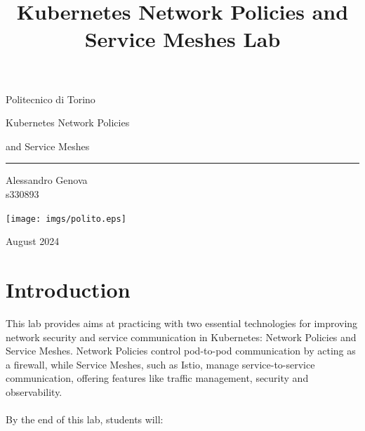 \documentclass{article}
\title{Kubernetes Network Policies and Service Meshes Lab}
\date{} %
\begin{document}
\begin{center}
  \textnormal{\LARGE Politecnico di Torino} %
\end{center}

\begin{center}
  \vspace*{6cm} %
  {\color{myblue}\Huge \textsf{Kubernetes Network Policies}} %
  
  \vspace{0.5cm} %
  
  {\color{myblue}\Huge \textsf{and Service Meshes}} %
  
  \vspace{0.5cm} %
  \noindent\textcolor{myblue}{\rule{\textwidth}{0.8pt}} %
\end{center}

\vspace*{\fill}
\begin{center}
    \large Alessandro Genova \\ %
    \large s330893
    \vspace*{0.5cm}
\end{center}

\begin{center}
    \texttt{[image: imgs/polito.eps]} %
\end{center}

\begin{center}
    \vspace*{0.5cm}
    August 2024
\end{center} 

\newpage
\tableofcontents
\newpage

\section{Introduction}
This lab provides aims at practicing with two essential technologies for improving network security and service communication in Kubernetes: Network Policies and Service Meshes. Network Policies control pod-to-pod communication by acting as a firewall, while Service Meshes, such as Istio, manage service-to-service communication, offering features like traffic management, security and observability.
\\\\
By the end of this lab, students will:
\end{document}
